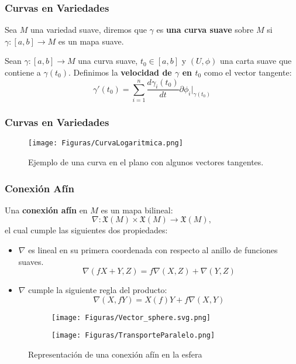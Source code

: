 \begin{frame}
	\frametitle{Curvas en Variedades}
	\begin{definition}
		Sea $M$ una variedad suave, diremos que $\gamma$ es \textbf{una curva suave} sobre $M$ si $\gamma: [a,b] \to M$ es un mapa suave.
	\end{definition} \pause

	\begin{definition}
		Sean $\gamma: [a,b] \to M$ una curva suave, $t_0 \in [a,b]$ y $(U,\phi)$ una carta suave que contiene a $\gamma(t_0)$. Definimos la \textbf{velocidad de $\gamma$ en $t_0$} como el vector tangente:
		\[
			\gamma'(t_0) = \sum_{i=1}^{n} \frac{d\gamma_i(t_0)}{dt} \partial \phi_{i} \big|_{\gamma(t_0)}
		\]
	\end{definition}
\end{frame}

\begin{frame}
	\frametitle{Curvas en Variedades}
	\begin{figure}
		\texttt{[image: Figuras/CurvaLogaritmica.png]}
		\caption{Ejemplo de una curva en el plano con algunos vectores tangentes.}
	\end{figure}
\end{frame}

\begin{frame}
	\frametitle{Conexión Afín}
	\begin{definition}
		Una \textbf{conexión afín} en $M$ es un mapa bilineal:
		\[
			\nabla: \mathfrak{X}(M) \times \mathfrak{X}(M) \to \mathfrak{X}(M),
		\]\pause
		el cual cumple las siguientes dos propiedades:
		\begin{itemize}
			\item $\nabla$ es lineal en su primera coordenada con respecto al anillo de funciones suaves.
			      \[
				      \nabla(fX + Y, Z) = f\nabla(X,Z) + \nabla(Y,Z)
			      \]\pause
			\item $\nabla$ cumple la siguiente regla del producto:
			      \[
				      \nabla(X,fY) = X(f) Y + f\nabla(X,Y)
			      \]
		\end{itemize}
	\end{definition}
\end{frame}


\begin{frame}
\begin{center}
	\begin{figure}[h]
		\centering
		\begin{subfigure}{0.30\textwidth}
			\centering
			\texttt{[image: Figuras/Vector\_sphere.svg.png]}
		\end{subfigure}
		\hspace{50pt}
		\begin{subfigure}{0.30\textwidth}
			\centering
			\texttt{[image: Figuras/TransporteParalelo.png]}
		\end{subfigure}
		\caption{Representación de una conexión afín en la esfera}
	\end{figure}
\end{center}
\end{frame}

